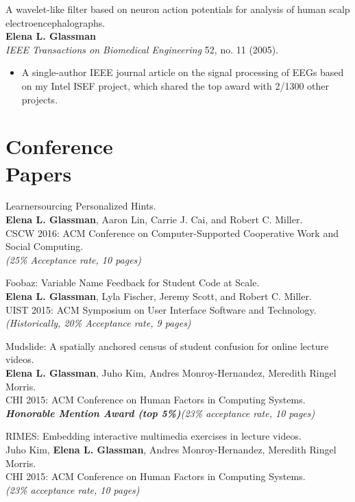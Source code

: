 \documentclass[margin]{res}
\begin{document}
\begin{resume}

A wavelet-like filter based on neuron action potentials for analysis of human scalp electroencephalographs.\\ 
{\bf Elena L. Glassman}\\
\textit{IEEE Transactions on Biomedical Engineering} 52, no. 11 (2005).
\begin{itemize} \itemsep -2pt  %
\item A single-author IEEE journal article on the signal processing of EEGs based on my Intel ISEF project, which shared the top award with 2/1300 other projects. 
\end{itemize}

\section{Conference\\ Papers}

Learnersourcing Personalized Hints.\\
{\bf Elena L. Glassman}, Aaron Lin, Carrie J. Cai, and Robert C. Miller.\\
CSCW 2016: ACM Conference on Computer-Supported Cooperative Work and Social Computing.\\
{\it (25\% Acceptance rate, 10 pages)}

Foobaz: Variable Name Feedback for Student Code at Scale.\\
{\bf Elena L. Glassman}, Lyla Fischer, Jeremy Scott, and Robert C. Miller.\\ 
UIST 2015: ACM Symposium on User Interface Software and Technology. \\
{\it (Historically, 20\% Acceptance rate, 9 pages)}

Mudslide: A spatially anchored census of student confusion for online lecture videos.\\
{\bf Elena L. Glassman}, Juho Kim, Andres Monroy-Hernandez, Meredith Ringel Morris.\\
CHI 2015: ACM Conference on Human Factors in Computing Systems.\\
\textbf{\emph{Honorable Mention Award (top 5\%)}}{\it (23\% acceptance rate, 10 pages)}

RIMES: Embedding interactive multimedia exercises in lecture videos.\\
Juho Kim, {\bf Elena L. Glassman}, Andres Monroy-Hernandez, Meredith Ringel Morris. \\
CHI 2015: ACM Conference on Human Factors in Computing Systems.\\
{\it (23\% acceptance rate, 10 pages)}


\end{resume}
\end{document}
